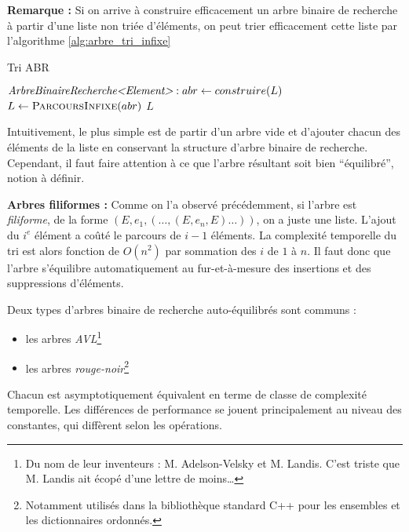 \documentclass[../../../main.tex]{subfiles}
\begin{document}
\textbf{Remarque :} Si on arrive à construire efficacement un arbre binaire de recherche à partir d'une liste non triée d'éléments, on peut trier efficacement cette liste par l'algorithme \ref{alg:arbre_tri_infixe}

\begin{algorithm}
\caption{Tri ABR\label{alg:arbre_tri_infixe}}
$\textit{ArbreBinaireRecherche\textless{}Element\textgreater}:abr \leftarrow construire(L)$\;
$L\leftarrow \textsc{ParcoursInfixe}(abr)$\;
\Return $L$\;
\end{algorithm}

Intuitivement, le plus simple est de partir d'un arbre vide et d'ajouter chacun des éléments de la liste en conservant la structure d'arbre binaire de recherche. Cependant, il faut faire attention à ce que l'arbre résultant soit bien ``équilibré'', notion à définir. 

\textbf{Arbres filiformes :} Comme on l'a observé précédemment, si l'arbre est \textit{filiforme}, de la forme $(E, e_1, (\dots, (E, e_n, E)\dots))$, on a juste une liste. L'ajout du $i^e$ élément a coûté le parcours de $i-1$ éléments. La complexité temporelle du tri est alors fonction de $O(n^2)$ par sommation des $i$ de $1$ à $n$. Il faut donc que l'arbre s'équilibre automatiquement au fur-et-à-mesure des insertions et des suppressions d'éléments.

Deux types d'arbres binaire de recherche auto-équilibrés sont communs :
\begin{itemize}
	\item les arbres \textit{AVL}\footnote{Du nom de leur inventeurs : M. Adelson-Velsky et M. Landis. C'est triste que M. Landis ait écopé d'une lettre de moins\dots}
	\item les arbres \textit{rouge-noir}\footnote{Notamment utilisés dans la bibliothèque standard C++ pour les ensembles et les dictionnaires ordonnés.}
\end{itemize}
Chacun est asymptotiquement équivalent en terme de classe de complexité temporelle. Les différences de performance se jouent principalement au niveau des constantes, qui diffèrent selon les opérations.
\end{document}
